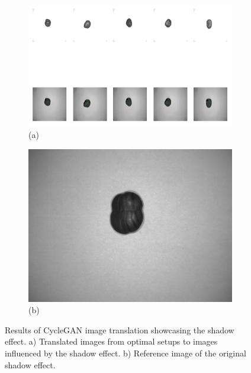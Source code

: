 \documentclass[12pt,DIV14,BCOR12mm,a4paper,footinclude=false,headinclude,parskip=half-,twoside,openright,cleardoublepage=empty,toc=index,bibliography=totoc,listof=totoc]{scrreprt}
\numberwithin{equation}{chapter}
\begin{document}
\begin{figure}
    \centering
    \begin{subfigure}[b]{1.0\textwidth}
        \centering
        \includegraphics[width=\textwidth]{../media/Shadow.png}
        \caption*{(a)}
    \end{subfigure}
    \hfill
    \begin{subfigure}[b]{0.25\textwidth}
        \centering
        \includegraphics[width=\textwidth]{../media/shadow_real.png}
        \caption*{(b)}
    \end{subfigure}
    \caption{Results of CycleGAN image translation showcasing the shadow effect. a) Translated images from optimal setups to images influenced by the shadow effect. b) Reference image of the original shadow effect.}
    \label{fig:shadow_effect_result}
\end{figure}
\end{document}
